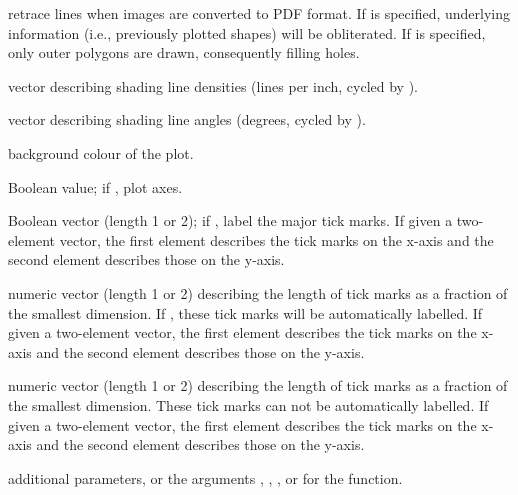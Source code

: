 \documentclass[letterpaper]{book}
\begin{document}
\begin{Arguments}
\begin{ldescription}
retrace lines when images are converted to PDF format. If
 is specified, underlying information (i.e., previously
plotted shapes) will be obliterated.  If  is specified, only
outer polygons are drawn, consequently filling holes.
\item[\code{density}] vector describing shading line densities (lines per
inch, cycled by ).
\item[\code{angle}] vector describing shading line angles (degrees, cycled by
).
\item[\code{bg}] background colour of the plot.
\item[\code{axes}] Boolean value; if , plot axes.
\item[\code{tckLab}] Boolean vector (length 1 or 2); if ,
label the major tick marks.  If given a two-element
vector, the first element describes the tick marks on the
x-axis and the second element describes those on the y-axis.
\item[\code{tck}] numeric vector (length 1 or 2) describing the length
of tick marks as a fraction of the smallest dimension. If
, these tick marks will be automatically
labelled.  If given a two-element vector, the first element
describes the tick marks on the x-axis and the second element
describes those on the y-axis.
\item[\code{tckMinor}] numeric vector (length 1 or 2) describing the length
of tick marks as a fraction of the smallest dimension.  These tick
marks can not be automatically labelled.  If given a two-element vector,
the first element describes the tick marks on the x-axis and
the second element describes those on the y-axis.
\item[\code{...}] additional  parameters, or the arguments
, , , or  for the
 function.
\end{ldescription}
\end{Arguments}
%
\end{document}
